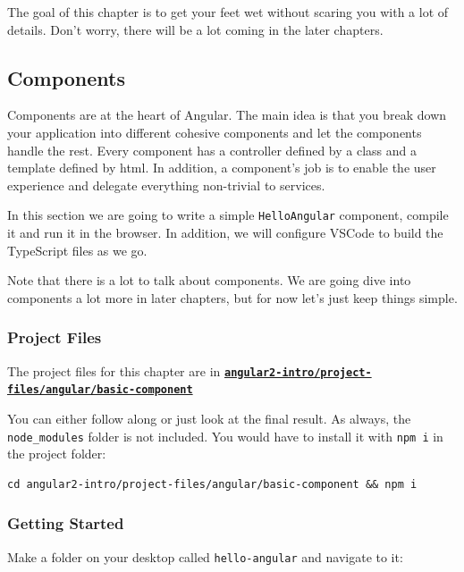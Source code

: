 \documentclass[12pt,]{article}
\begin{document}
The goal of this chapter is to get your feet wet without scaring you
with a lot of details. Don't worry, there will be a lot coming in the
later chapters.

\subsection{Components}\label{components}

Components are at the heart of Angular. The main idea is that you break
down your application into different cohesive components and let the
components handle the rest. Every component has a controller defined by
a class and a template defined by html. In addition, a component's job
is to enable the user experience and delegate everything non-trivial to
services.

In this section we are going to write a simple \texttt{HelloAngular}
component, compile it and run it in the browser. In addition, we will
configure VSCode to build the TypeScript files as we go.

Note that there is a lot to talk about components. We are going dive
into components a lot more in later chapters, but for now let's just
keep things simple.

\subsubsection{Project Files}\label{project-files}

The project files for this chapter are in
\textbf{\href{https://github.com/st32lth/angular2-intro/tree/master/project-files/angular/basic-component}{\texttt{angular2-intro/project-files/angular/basic-component}}}

You can either follow along or just look at the final result. As always,
the \texttt{node\_modules} folder is not included. You would have to
install it with \texttt{npm\ i} in the project folder:

\begin{verbatim}
cd angular2-intro/project-files/angular/basic-component && npm i
\end{verbatim}

\subsubsection{Getting Started}\label{getting-started}

Make a folder on your desktop called \texttt{hello-angular} and navigate
to it:
\end{document}
